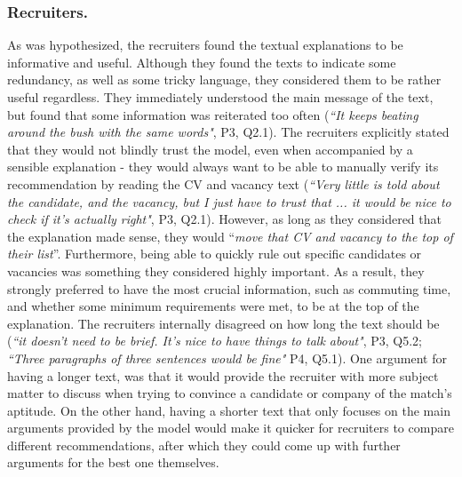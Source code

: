 \subsubsection{Recruiters.}
As was hypothesized, the recruiters found the textual explanations to be informative and useful. Although they found the texts to indicate some redundancy, as well as some tricky language, they considered them to be rather useful regardless. They immediately understood the main message of the text, but found that some information was reiterated too often (\textit{``It keeps beating around the bush with the same words"}, P3, Q2.1). The recruiters explicitly stated that they would not blindly trust the model, even when accompanied by a sensible explanation - they would always want to be able to manually verify its recommendation by reading the CV and vacancy text (\textit{``Very little is told about the candidate, and the vacancy, but I just have to trust that ... it would be nice to check if it's actually right"}, P3, Q2.1). However, as long as they considered that the explanation made sense, they would ``\textit{move that CV and vacancy to the top of their list}''. Furthermore, being able to quickly rule out specific candidates or vacancies was something they considered highly important. As a result, they strongly preferred to have the most crucial information, such as commuting time, and whether some minimum requirements were met, to be at the top of the explanation. The recruiters internally disagreed on how long the text should be (\textit{``it doesn't need to be brief. It's nice to have things to talk about"}, P3, Q5.2; \textit{``Three paragraphs of three sentences would be fine"} P4, Q5.1). One argument for having a longer text, was that it would provide the recruiter with more subject matter to discuss when trying to convince a candidate or company of the match's aptitude. On the other hand, having a shorter text that only focuses on the main arguments provided by the model would make it quicker for recruiters to compare different recommendations, after which they could come up with further arguments for the best one themselves. 

